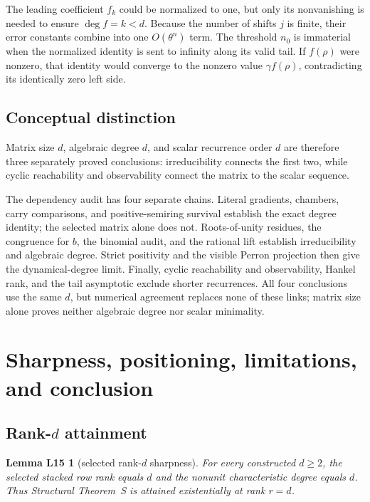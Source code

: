 \documentclass[11pt,letterpaper]{article}
\theoremstyle{plain}
\newtheorem*{lemLfifteen}{Lemma L15}
\begin{document}
The leading coefficient \(f_k\) could be normalized to one, but only its nonvanishing is needed to ensure \(\deg f=k<d\).  Because the number of shifts \(j\) is finite, their error constants combine into one \(O(\theta^n)\) term.  The threshold \(n_0\) is immaterial when the normalized identity is sent to infinity along its valid tail.  If \(f(\rho)\) were nonzero, that identity would converge to the nonzero value \(\gamma f(\rho)\), contradicting its identically zero left side.

\subsection{Conceptual distinction}

Matrix size $d$, algebraic degree $d$, and scalar recurrence order $d$ are therefore three separately proved conclusions: irreducibility connects the first two, while cyclic reachability and observability connect the matrix to the scalar sequence.

The dependency audit has four separate chains.  Literal gradients, chambers, carry comparisons, and positive-semiring survival establish the exact degree identity; the selected matrix alone does not.  Roots-of-unity residues, the congruence for $b$, the binomial audit, and the rational lift establish irreducibility and algebraic degree.  Strict positivity and the visible Perron projection then give the dynamical-degree limit.  Finally, cyclic reachability and observability, Hankel rank, and the tail asymptotic exclude shorter recurrences.  All four conclusions use the same $d$, but numerical agreement replaces none of these links; matrix size alone proves neither algebraic degree nor scalar minimality.

\section{Sharpness, positioning, limitations, and conclusion}
\label{sec:sharpness}

\subsection{Rank-\texorpdfstring{$d$}{d} attainment}

\begin{lemLfifteen}[selected rank-$d$ sharpness]
For every constructed $d\geq2$, the selected stacked row rank equals $d$ and the nonunit characteristic degree equals $d$.  Thus Structural Theorem~S is attained existentially at rank $r=d$.
\end{lemLfifteen}
\end{document}
